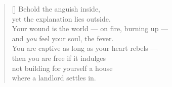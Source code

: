 \documentclass[a4paper,12pt,twoside,final]{book}
\begin{document}

\settowidth{\versewidth}{Your wound is the world --- on fire, burning up ---}

\begin{verse}[\versewidth]
  Behold the anguish inside, \\
  yet the explanation lies outside. \\
  Your wound is the world --- on fire, burning up --- \\
  and \emph{you} feel your soul, the fever. \\
  You are captive as long as your heart rebels --- \\
  then you are free if it indulges \\
  not building for yourself a house \\
  where a landlord settles in.
\end{verse}


\newpage

\settowidth{\versewidth}{nem raksz magadnak olyan házat,}
\end{document}
